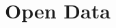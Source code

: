 \documentclass[10pt,compress,serif,aspectratio=169]{beamer}
\begin{document}

% 
% 
%   
% 
%     


\section{Open Data}
\end{document}
